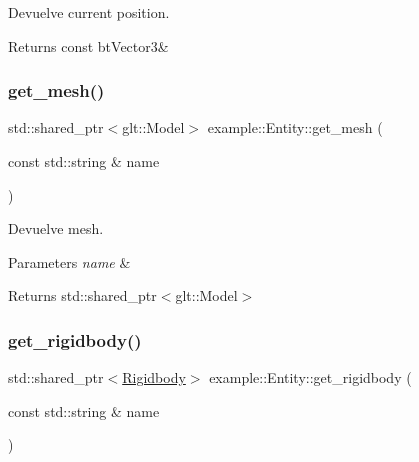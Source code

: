 Devuelve current position. 

\begin{DoxyReturn}{Returns}
const bt\+Vector3\& 
\end{DoxyReturn}
\mbox{\label{classexample_1_1_entity_afd9c242b61271516546ae88c92563d63}} 
\subsubsection{\texorpdfstring{get\_mesh()}{get\_mesh()}}
{\footnotesize\ttfamily std\+::shared\+\_\+ptr$<$glt\+::\+Model$>$ example\+::\+Entity\+::get\+\_\+mesh (\begin{DoxyParamCaption}\item[{const std\+::string \&}]{name }\end{DoxyParamCaption})\hspace{0.3cm}{\ttfamily [inline]}}



Devuelve mesh. 


\begin{DoxyParams}{Parameters}
{\em name} & \\
\hline
\end{DoxyParams}
\begin{DoxyReturn}{Returns}
std\+::shared\+\_\+ptr$<$glt\+::\+Model$>$ 
\end{DoxyReturn}
\mbox{\label{classexample_1_1_entity_a032f94ab3e0654a11c83dc6ddb650e5c}} 
\subsubsection{\texorpdfstring{get\_rigidbody()}{get\_rigidbody()}}
{\footnotesize\ttfamily std\+::shared\+\_\+ptr$<$\mbox{\hyperlink{classexample_1_1_rigidbody}{Rigidbody}}$>$ example\+::\+Entity\+::get\+\_\+rigidbody (\begin{DoxyParamCaption}\item[{const std\+::string \&}]{name }\end{DoxyParamCaption})\hspace{0.3cm}{\ttfamily [inline]}}




